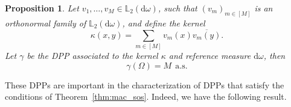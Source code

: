 \documentclass[twoside,11pt]{book}
\newtheorem{proposition}{Proposition}
\numberwithin{theorem}{chapter}
\numberwithin{definition}{chapter}
\numberwithin{proposition}{chapter}
\numberwithin{corollary}{chapter}
\numberwithin{example}{chapter}
\numberwithin{lemma}{chapter}
\begin{document}
\begin{proposition}
Let $v_{1}, \dots, v_{M} \in \mathbb{L}_{2}(\mathrm{d}\omega)$, such that $(v_{m})_{m \in [M]}$ is an orthonormal family of $\mathbb{L}_{2}(\mathrm{d}\omega)$, and define the kernel
\begin{equation}
\kappa(x,y) = \sum\limits_{m \in [M]}v_{m}(x)\overline{v_{m}(y)}. 
\end{equation} 
Let $\gamma$ be the DPP associated to the kernel $\kappa$ and reference measure $\mathrm{d}\omega$, then 
\begin{equation}
\gamma(\Omega) = M \:\: \text{a.s.}
\end{equation}


\end{proposition}


These DPPs are important in the characterization of DPPs that satisfy the conditions of Theorem~\ref{thm:mac_sos}. Indeed, we have the following result. 
\end{document}
